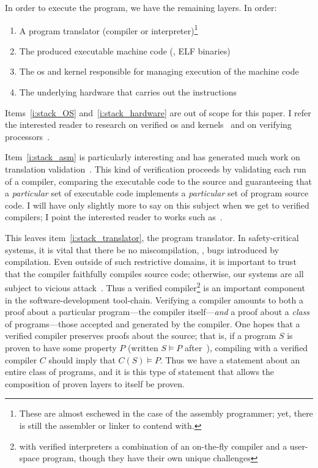 In order to execute the program, we have the remaining layers. In order:
\begin{enumerate}
    \item\label{i:stack_translator} A program translator (compiler or
        interpreter)\footnote{These are almost eschewed in the case of the
        assembly programmer; yet, there is still the assembler or linker to
        contend with.}
    \item\label{i:stack_asm} The produced executable machine code (\eg, ELF
        binaries)
    \item\label{i:stack_OS} The \gls{os} and kernel responsible for managing execution
        of the machine code
    \item\label{i:stack_hardware} The underlying hardware that carries out the
        instructions
\end{enumerate}

Items~\ref{i:stack_OS} and~\ref{i:stack_hardware} are out of scope for this
paper. I refer the interested reader to research on verified \gls{os} and
kernels~\cite{Klein_EHACDEEKNSTW_09,Klein_AEHCDEEKNSTW_10,Klein_AEMSKH_14,Sewell_KH_16,Narayanan_2019,Narayan_2020,Nelson_2017}
and on verifying
processors~\cite{sturton-memocode13,Sturton_2013,Bradfield_2016,zhang2017identifying,zhang2018recursive,zhang2018end}.

Item~\ref{i:stack_asm} is particularly interesting and has generated much work
on translation validation~\cite{Pnueli_1998}. This kind of verification proceeds
by validating each run of a compiler, comparing the executable code to the
source and guaranteeing that a \emph{particular} set of executable code
implements a \emph{particular} set of program source code. I will have only
slightly more to say on this subject when we get to verified compilers; I point
the interested reader to works such
as~\cite{Sewell:phd,Sewell_KH_16,Sewell_2013,Necula_2000}.

This leaves item~\ref{i:stack_translator}, the program translator. In
safety-critical systems, it is vital that there be no miscompilation, \ie, bugs
introduced by compilation. Even outside of such restrictive domains, it is
important to trust that the compiler faithfully compiles source code; otherwise,
our systems are all subject to vicious attack~\cite{Thompson_1984}. Thus a
verified compiler\footnote{with verified interpreters a combination of an
on-the-fly compiler and a user-space program, though they have their own unique
challenges} is an important component in the software-development tool-chain.
Verifying a compiler amounts to both a proof about a particular program---the
compiler itself---\emph{and} a proof about a \emph{class} of programs---those
accepted and generated by the compiler. One hopes that a verified compiler
preserves proofs about the source; that is, if a program \(S\) is proven to have
some property \(P\) (written \(S \models P\) after~\cite{Leroy-Compcert-CACM}),
compiling with a verified compiler \(C\) should imply that \(C(S) \models P\).
Thus we have a statement about an entire class of programs, and it is this type
of statement that allows the composition of proven layers to itself be proven.

